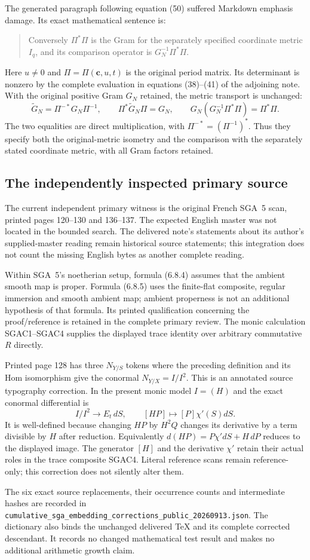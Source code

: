 The generated paragraph following equation (50) suffered Markdown
emphasis damage.  Its exact mathematical sentence is:
\begin{quote}
Conversely $\Pi^*\Pi$ is the Gram for the separately specified
coordinate metric $I_q$, and its comparison operator is
$G_N^{-1}\Pi^*\Pi$.
\end{quote}
Here $u\ne0$ and $\Pi=\Pi(\mathbf c,u,t)$ is the original period
matrix.  Its determinant is nonzero by the complete evaluation in
equations (38)--(41) of the adjoining note.  With the original positive
Gram $G_N$ retained, the metric transport is unchanged:
\[
 \widetilde G_N=\Pi^{-*}G_N\Pi^{-1},\qquad
 \Pi^*\widetilde G_N\Pi=G_N,
 \qquad G_N(G_N^{-1}\Pi^*\Pi)=\Pi^*\Pi.
 \tag{SGAC7}
\]
The two equalities are direct multiplication, with
$\Pi^{-*}=(\Pi^{-1})^*$.  Thus they specify both the original-metric
isometry and the comparison with the separately stated coordinate
metric, with all Gram factors retained.

\subsection{The independently inspected primary source}

The current independent primary witness is the original French
SGA~5 scan, printed pages 120--130 and 136--137.  The expected English
master was not located in the bounded search.  The delivered note's
statements about its author's supplied-master reading remain historical
source statements; this integration does not count the missing English
bytes as another complete reading.

Within SGA~5's noetherian setup, formula (6.8.4) assumes that the
ambient smooth map is proper.  Formula (6.8.5) uses the finite-flat
composite, regular immersion and smooth ambient map; ambient properness
is not an additional hypothesis of that formula.  Its printed
qualification concerning the proof/reference is retained in the
complete primary review.  The monic calculation SGAC1--SGAC4 supplies
the displayed trace identity over arbitrary commutative $R$ directly.

Printed page 128 has three $N_{Y/S}$ tokens where the preceding
definition and its Hom isomorphism give the conormal
$N_{Y/X}=I/I^2$.  This is an annotated source typography correction.
In the present monic model $I=(H)$ and the exact conormal differential is
\[
 I/I^2\longrightarrow E_t\,dS,\qquad
 [H P]\longmapsto[P]\chi'(S)dS.
 \tag{SGAC8}
\]
It is well-defined because changing $HP$ by $H^2Q$ changes its
derivative by a term divisible by $H$ after reduction.  Equivalently
$d(HP)=P\chi'dS+H\,dP$ reduces to the displayed image.  The
generator $[H]$ and the derivative $\chi'$ retain their actual
roles in the trace composite SGAC4.  Literal reference scans remain
reference-only; this correction does not silently alter them.

The six exact source replacements, their occurrence counts and
intermediate hashes are recorded in
\nolinkurl{cumulative_sga_embedding_corrections_public_20260913.json}.
The dictionary also binds the unchanged delivered TeX and its complete
corrected descendant.  It records no changed mathematical test result
and makes no additional arithmetic growth claim.
